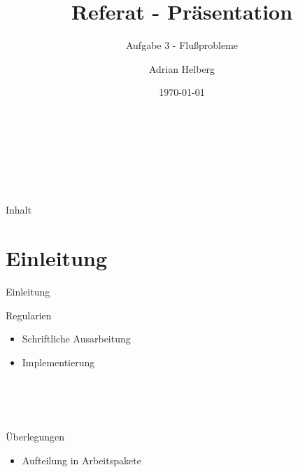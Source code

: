 \documentclass{beamer}
\author{Adrian Helberg}
\title{Referat - Pr\"asentation}
\subtitle{Aufgabe 3 - Flu\ss{}probleme}
\date{\today}
\begin{document}
    \begin{frame}[plain]
        \maketitle
        \small
        \\~\\~\\~\\
    \end{frame}

    \begin{frame}{Inhalt}
        \tableofcontents
    \end{frame}

    \section{Einleitung}
    \begin{frame}{Einleitung}
        \begin{block}{Regularien}
            \begin{itemize}
                \item Schriftliche Ausarbeitung
                \item Implementierung
            \end{itemize}
        \end{block}

        \\~\\~\\

        \begin{block}{\"Uberlegungen}
            \begin{itemize}
                \item Aufteilung in Arbeitspakete
            \end{itemize}
        \end{block}
    \end{frame}
\end{document}
